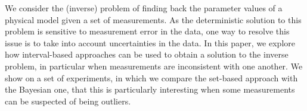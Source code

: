 
We consider the (inverse) problem of finding back the parameter values of a physical model given a set of measurements. As the deterministic solution to this problem is sensitive to measurement error in the data, one way to resolve this issue is to take into account uncertainties in the data. In this paper, we explore how interval-based approaches can be used to obtain a solution to the inverse problem, in particular when measurements are inconsistent with one another. We show on a set of experiments, in which we compare the set-based approach with the Bayesian one, that this is particularly interesting when some measurements can be suspected of being outliers.  

